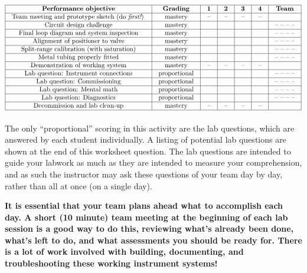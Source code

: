 $$\vbox{\offinterlineskip
\halign{\strut
\vrule \quad\hfil # \ \hfil & 
\vrule \quad\hfil # \ \hfil & 
\vrule \quad\hfil # \ \hfil & 
\vrule \quad\hfil # \ \hfil & 
\vrule \quad\hfil # \ \hfil & 
\vrule \quad\hfil # \ \hfil & 
\vrule \quad\hfil # \ \hfil \vrule \cr
\noalign{\hrule}
%
{\bf Performance objective} & {\bf Grading} & {\bf 1} & {\bf 2} & {\bf 3} & {\bf 4} & {\bf Team} \cr
%
\noalign{\hrule}
%
Team meeting and prototype sketch (do {\it first!}) & mastery & -- & -- & -- & -- & \cr
%
\noalign{\hrule}
%
Circuit design challenge & mastery & & & & & -- -- -- -- \cr
%
\noalign{\hrule}
%
Final loop diagram and system inspection & mastery & & & & & -- -- -- -- \cr
%
\noalign{\hrule}
%
Alignment of positioner to valve & mastery & & & & & -- -- -- -- \cr
%
\noalign{\hrule}
%
Split-range calibration (with saturation) & mastery & & & & & -- -- -- -- \cr
%
\noalign{\hrule}
%
Metal tubing properly fitted & mastery & & & & & -- -- -- -- \cr
%
\noalign{\hrule}
%
Demonstration of working system & mastery & -- & -- & -- & -- & \cr
%
\noalign{\hrule}
%
Lab question: Instrument connections & proportional &  &  &  &  & -- -- -- -- \cr
%
\noalign{\hrule}
%
Lab question: Commissioning & proportional &  &  &  &  & -- -- -- -- \cr
%
\noalign{\hrule}
%
Lab question: Mental math & proportional &  &  &  &  & -- -- -- -- \cr
%
\noalign{\hrule}
%
Lab question: Diagnostics & proportional &  &  &  &  & -- -- -- -- \cr
%
\noalign{\hrule}
%
Decommission and lab clean-up & mastery & -- & -- & -- & -- &  \cr
%
\noalign{\hrule}
} %
}$$ %

The only ``proportional'' scoring in this activity are the lab questions, which are answered by each student individually.  A listing of potential lab questions are shown at the end of this worksheet question.  The lab questions are intended to guide your labwork as much as they are intended to measure your comprehension, and as such the instructor may ask these questions of your team day by day, rather than all at once (on a single day).


{\bf It is essential that your team plans ahead what to accomplish each day.  A short (10 minute) team meeting at the beginning of each lab session is a good way to do this, reviewing what's already been done, what's left to do, and what assessments you should be ready for.  There is a lot of work involved with building, documenting, and troubleshooting these working instrument systems!}

